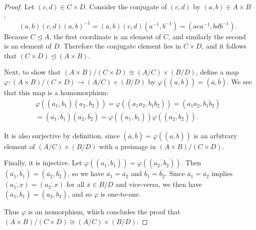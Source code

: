 \documentclass{article}
\begin{document}
\begin{proof}
    Let $(c, d) \in C \times D$. Consider the conjugate of $(c, d)$ by $(a, b) \in A \times B$:
    \begin{equation*}
        (a, b)(c, d)(a, b)^{-1} = (a, b)(c, d)(a^{-1}, b^{-1}) = (aca^{-1}, bdb^{-1}).
    \end{equation*}
    Because $C \unlhd A$, the first coordinate is an element of $C$, and similarly the second is an element of $D$. Therefore the conjugate element lies in $C \times D$, and it follows that $(C \times D) \unlhd (A \times B)$.

    Next, to show that $(A \times B)/(C \times D) \cong (A / C) \times (B / D)$, define a map $\varphi: (A \times B)/(C \times D) \rightarrow (A / C) \times (B / D)$ by $\varphi((\overline{a, b})) = (\overline{a}, \overline{b})$. We see that this map is a homomorphism:
    \begin{multline*}
        \varphi((\overline{a_1, b_1})(\overline{a_2, b_2})) = \varphi((\overline{a_1 a_2, b_1 b_2})) = (\overline{a_1 a_2}, \overline{b_1 b_2}) \\ = (\overline{a_1}, \overline{b_1})(\overline{a_2}, \overline{b_2}) = \varphi((\overline{a_1, b_1}))\varphi((\overline{a_2, b_2})).
    \end{multline*}

    It is also surjective by definition, since $(\overline{a}, \overline{b}) = \varphi((\overline{a, b}))$ is an arbitrary element of $(A / C) \times (B / D)$ with a preimage in $(A \times B)/(C \times D)$.

    Finally, it is injective. Let $\varphi((\overline{a_1, b_1})) = \varphi((\overline{a_2, b_2}))$. Then $(\overline{a_1}, \overline{b_1}) = (\overline{a_2}, \overline{b_2})$, so we have $\overline{a_1} = \overline{a_2}$ and $\overline{b_1} = \overline{b_2}$. Since $\overline{a_1} = \overline{a_2}$ implies $(\overline{a_1, x}) = (\overline{a_2, x})$ for all $\overline{x} \in B/D$ and vice-versa, we then have $(\overline{a_1, b_1}) = (\overline{a_2, b_2})$, and so $\varphi$ is one-to-one.

    Thus $\varphi$ is an isomorphism, which concludes the proof that $(A \times B)/(C \times D) \cong (A / C) \times (B / D)$.
\end{proof}
\end{document}
